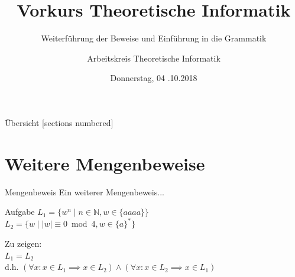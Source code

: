 

\title{Vorkurs Theoretische Informatik}
\subtitle{Weiterführung der Beweise und Einführung in die Grammatik}
\date{Donnerstag, 04 .10.2018}
\author{Arbeitskreis Theoretische Informatik}



\maketitle

\begin{frame}[fragile]{Übersicht}
  [sections numbered]
  \tableofcontents%
\end{frame}

\section{Weitere Mengenbeweise}

\begin{frame}{Mengenbeweis}
    Ein weiterer Mengenbeweis...
    \begin{block}{\alert{Aufgabe}}
    $L_1=\{w^{n} \mid n \in \mathbb{N}, w \in \{aaaa\}\}$\\
    $L_2=\{w \mid |w| \equiv 0 \bmod 4, w \in \{a\}^*\}$
    \end{block}
    Zu zeigen:\\
    $L_1 = L_2$\\
    d.h. $(\forall x: x \in L_1 \implies x \in L_2) \wedge (\forall x: x \in L_2 \implies x \in L_1)$

\end{frame}

